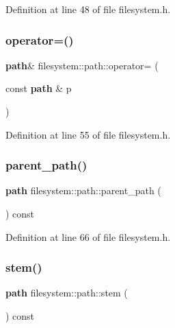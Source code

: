 Definition at line 48 of file filesystem.\+h.

\mbox{\label{classfilesystem_1_1path_a791421870fb00d112d4cfd134be6fe14}} 
\subsubsection{operator=()\hspace{0.1cm}{\footnotesize\ttfamily [2/2]}}
{\footnotesize\ttfamily \textbf{ path}\& filesystem\+::path\+::operator= (\begin{DoxyParamCaption}\item[{const \textbf{ path} \&}]{p }\end{DoxyParamCaption})\hspace{0.3cm}{\ttfamily [inline]}}



Definition at line 55 of file filesystem.\+h.

\mbox{\label{classfilesystem_1_1path_a9564a7fc0e33bcc606510c5de5a38627}} 
\subsubsection{parent\_path()}
{\footnotesize\ttfamily \textbf{ path} filesystem\+::path\+::parent\+\_\+path (\begin{DoxyParamCaption}{ }\end{DoxyParamCaption}) const\hspace{0.3cm}{\ttfamily [inline]}}



Definition at line 66 of file filesystem.\+h.

\mbox{\label{classfilesystem_1_1path_a0acd461c2e26239ed76fd9f269dae8ca}} 
\subsubsection{stem()}
{\footnotesize\ttfamily \textbf{ path} filesystem\+::path\+::stem (\begin{DoxyParamCaption}{ }\end{DoxyParamCaption}) const\hspace{0.3cm}{\ttfamily [inline]}}



